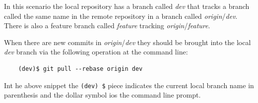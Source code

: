 \documentclass[10pt]{article}
\newcommand{\ket}[1]{$\left|#1\right\rangle$}
\newcommand{\Om}[1]{\small $\omega_{#1}$}
\newcommand{\De}[1]{$\Delta_{#1}$}
\newcommand{\Ga}[1]{$\Gamma_{#1}$}
\begin{document}
In this scenario the local repository has a branch called \textit{dev} that tracks a branch called the same name in the remote repository in a branch called \textit{origin}/\textit{dev}.
There is also a feature branch called \textit{feature} tracking \textit{origin}/\textit{feature}.

When there are new commits in \textit{origin}/\textit{dev} they should be brought into the local \textit{dev} branch via the following operation at the command line:

\begin{verbatim}
    (dev)$ git pull --rebase origin dev 
\end{verbatim}


Int he above snippet the \verb|(dev) $| piece indicates the current local branch name in parenthesis and the dollar symbol ios the command line prompt.




\end{document}

